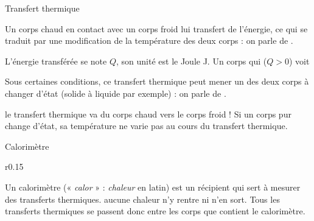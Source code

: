 \begin{doc}{Transfert thermique}
  \begin{importants}
    Un corps chaud en contact avec un corps froid lui transfert de l'énergie, ce qui se traduit par une modification de la température des deux corps : on parle de .
  \end{importants}
  L'énergie transférée se note $Q$, son unité est le Joule \unit{\joule}.
  Un corps qui  ($Q > 0$) voit 
  
  \begin{importants}
    Sous certaines conditions, ce transfert thermique peut mener un des deux corps à changer d'état (solide à liquide par exemple) : on parle de .
  \end{importants}
  \attention le transfert thermique va  du corps chaud vers le corps froid !
  Si un corps pur change d'état, sa température ne varie pas au cours du transfert thermique.
\end{doc}

\begin{doc}{Calorimètre}
  \begin{wrapfigure}{r}{0.15\linewidth}
    \centering
    \vspace*{-30pt}
  \end{wrapfigure}
  
  Un calorimètre (« \textit{calor} » : \textit{chaleur} en latin) est un récipient qui sert à mesurer des transferts thermiques.
   aucune chaleur n'y rentre ni n'en sort.
  Tous les transferts thermiques se passent donc entre les corps que contient le calorimètre.
\end{doc}

